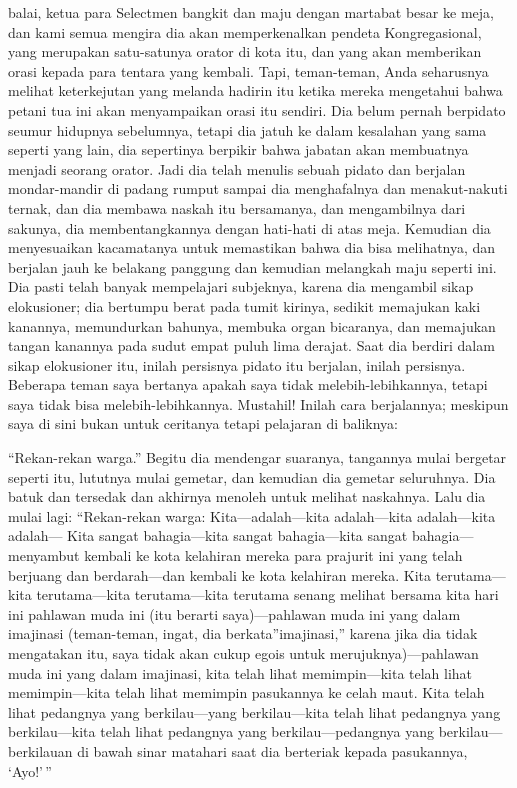 \documentclass[
  letterpaper,
  DIV=11,
  numbers=noendperiod]{scrreprt}
\begin{document}
balai, ketua para Selectmen bangkit dan maju dengan martabat besar ke
meja, dan kami semua mengira dia akan memperkenalkan pendeta
Kongregasional, yang merupakan satu-satunya orator di kota itu, dan yang
akan memberikan orasi kepada para tentara yang kembali. Tapi,
teman-teman, Anda seharusnya melihat keterkejutan yang melanda hadirin
itu ketika mereka mengetahui bahwa petani tua ini akan menyampaikan
orasi itu sendiri. Dia belum pernah berpidato seumur hidupnya
sebelumnya, tetapi dia jatuh ke dalam kesalahan yang sama seperti yang
lain, dia sepertinya berpikir bahwa jabatan akan membuatnya menjadi
seorang orator. Jadi dia telah menulis sebuah pidato dan berjalan
mondar-mandir di padang rumput sampai dia menghafalnya dan
menakut-nakuti ternak, dan dia membawa naskah itu bersamanya, dan
mengambilnya dari sakunya, dia membentangkannya dengan hati-hati di atas
meja. Kemudian dia menyesuaikan kacamatanya untuk memastikan bahwa dia
bisa melihatnya, dan berjalan jauh ke belakang panggung dan kemudian
melangkah maju seperti ini. Dia pasti telah banyak mempelajari
subjeknya, karena dia mengambil sikap elokusioner; dia bertumpu berat
pada tumit kirinya, sedikit memajukan kaki kanannya, memundurkan
bahunya, membuka organ bicaranya, dan memajukan tangan kanannya pada
sudut empat puluh lima derajat. Saat dia berdiri dalam sikap elokusioner
itu, inilah persisnya pidato itu berjalan, inilah persisnya. Beberapa
teman saya bertanya apakah saya tidak melebih-lebihkannya, tetapi saya
tidak bisa melebih-lebihkannya. Mustahil! Inilah cara berjalannya;
meskipun saya di sini bukan untuk ceritanya tetapi pelajaran di
baliknya:

``Rekan-rekan warga.'' Begitu dia mendengar suaranya, tangannya mulai
bergetar seperti itu, lututnya mulai gemetar, dan kemudian dia gemetar
seluruhnya. Dia batuk dan tersedak dan akhirnya menoleh untuk melihat
naskahnya. Lalu dia mulai lagi: ``Rekan-rekan warga:
Kita---adalah---kita adalah---kita adalah---kita adalah--- Kita sangat
bahagia---kita sangat bahagia---kita sangat bahagia---menyambut kembali
ke kota kelahiran mereka para prajurit ini yang telah berjuang dan
berdarah---dan kembali ke kota kelahiran mereka. Kita terutama---kita
terutama---kita terutama---kita terutama senang melihat bersama kita
hari ini pahlawan muda ini (itu berarti saya)---pahlawan muda ini yang
dalam imajinasi (teman-teman, ingat, dia berkata''imajinasi,'' karena
jika dia tidak mengatakan itu, saya tidak akan cukup egois untuk
merujuknya)---pahlawan muda ini yang dalam imajinasi, kita telah lihat
memimpin---kita telah lihat memimpin---kita telah lihat memimpin
pasukannya ke celah maut. Kita telah lihat pedangnya yang
berkilau---yang berkilau---kita telah lihat pedangnya yang
berkilau---kita telah lihat pedangnya yang berkilau---pedangnya yang
berkilau---berkilauan di bawah sinar matahari saat dia berteriak kepada
pasukannya, `Ayo!'\,''
\end{document}
